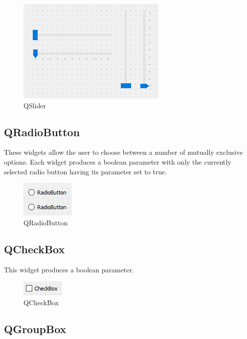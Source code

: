 \documentclass[a4paper,10pt]{book}
\begin{document}
\begin {figure}[!ht]
 \centering
 \includegraphics[scale=1.0]{images/widget/qslider}
 \caption{QSlider}
\end {figure}

\subsection{QRadioButton}

These widgets allow the user to choose between a number of mutually exclusive options. Each widget produces a boolean parameter with only the currently selected radio button having its parameter set to true.

\begin {figure}[!ht]
 \centering
 \includegraphics[scale=1.0]{images/widget/qradiobutton}
 \caption{QRadioButton}
\end {figure}

\subsection{QCheckBox}

This widget produces a boolean parameter.

\begin {figure}[!ht]
 \centering
 \includegraphics[scale=1.0]{images/widget/qcheckbox}
 \caption{QCheckBox}
\end {figure}

\subsection{QGroupBox}
\end{document}
